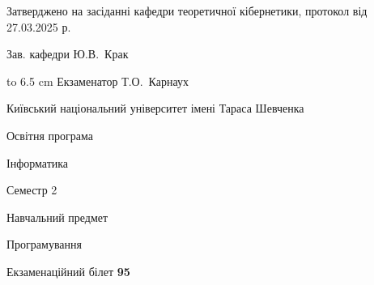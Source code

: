 \documentclass[12pt, ukrainian]{article}
\begin{document}
{\smallskip\smallskip \begin {scriptsize} Затверджено на засіданні кафедри теоретичної кібернетики, протокол   від   27.03.2025 р.\par\smallskip\smallskip\smallskip\smallskip
{\parbox {6.5 cm} {Зав. кафедри \dotfill Ю.В.~Крак}}\hspace {0.7cm} {\hbox to 6.5 cm { Екзаменатор \dotfill Т.О.~Карнаух}} \end{scriptsize}}
\newpage
{{\begin {scriptsize}\par
{ \center  Київський національний університет імені Тараса Шевченка \par}
{\parbox {5 cm}{Освітня програма \hfill}{\parbox {7 cm}{Інформатика\hfill}}\parbox {6 cm}{\hfill Семестр 2}}\par
{\parbox {5 cm} {Навчальний предмет \hfill}\parbox {7 cm}{Програмування \hfill}\parbox {6cm}{\hfill}\par}\vspace{-15pt} \end{scriptsize}}{\center Екзаменаційний білет \No \textbf { 95 }\par}}
\end{document}
